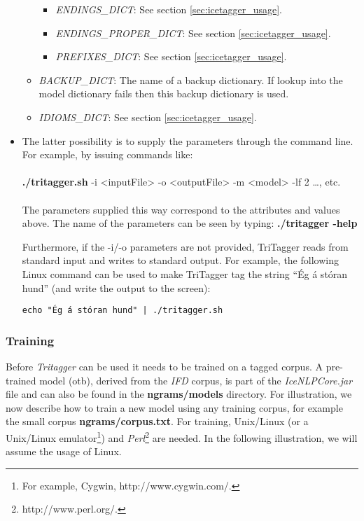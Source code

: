 \documentclass[11pt]{article}
\begin{document}
\begin{itemize}
\begin{itemize}
\begin{itemize}
\item \emph{ENDINGS\_DICT}: See section \ref{sec:icetagger_usage}.
\item \emph{ENDINGS\_PROPER\_DICT}: See section \ref{sec:icetagger_usage}.
\item \emph{PREFIXES\_DICT}: See section \ref{sec:icetagger_usage}.
\end{itemize}
\item \emph{BACKUP\_DICT}: The name of a backup dictionary. If lookup into the model dictionary fails then this backup dictionary is used.
\item \emph{IDIOMS\_DICT}: See section \ref{sec:icetagger_usage}.
\end{itemize}
\item The latter possibility is to supply the parameters through the command line. For example, by issuing commands like: \\ \\
\textbf{./tritagger.sh} -i <inputFile> -o <outputFile> -m <model> -lf 2 \ldots, etc. \\ \\
The parameters supplied this way correspond to the attributes and values above.
The name of the parameters can be seen by typing: \textbf{./tritagger -help}

Furthermore, if the -i/-o parameters are not provided, TriTagger reads from standard input and writes to standard output. For example, the following Linux command can be used to make TriTagger tag the string ``Ég á stóran hund'' (and write the output to the screen): 
\begin{verbatim}
echo "Ég á stóran hund" | ./tritagger.sh 
\end{verbatim}
\end{itemize}


\subsubsection{Training}
\label{sec:train}
Before \emph{Tritagger} can be used it needs to be trained on a tagged corpus.
A pre-trained model (otb), derived from the \emph{IFD} corpus, is part of the \emph{IceNLPCore.jar} file and can also be found in the {\bf ngrams/models} directory.
For illustration, we now describe how to train a new model using any training corpus, for example the small corpus \textbf{ngrams/corpus.txt}.
For training, Unix/Linux (or a Unix/Linux emulator\footnote{For example, Cygwin, http://www.cygwin.com/.}) and \emph{Perl}\footnote{http://www.perl.org/.} are needed.
In the following illustration, we will assume the usage of Linux.
\end{document}
